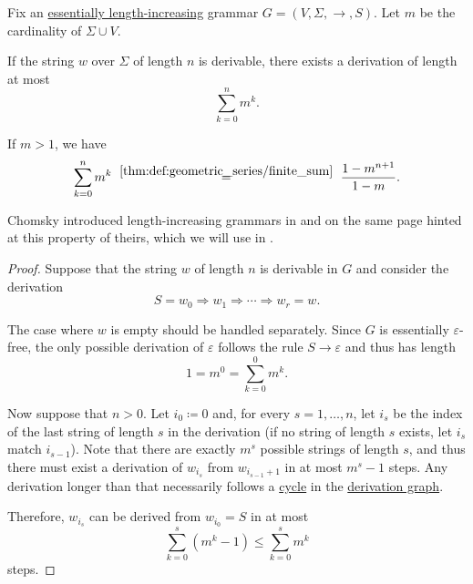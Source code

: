 \begin{lemma}\label{thm:length_increasing_grammar}
  Fix an \hyperref[def:length_increasing_grammar]{essentially length-increasing} grammar \( G = (V, \Sigma, \to, S) \). Let \( m \) be the cardinality of \( \Sigma \cup V \).

  If the string \( w \) over \( \Sigma \) of length \( n \) is derivable, there exists a derivation of length at most
  \begin{equation*}
    \sum_{k=0}^n m^k.
  \end{equation*}
\end{lemma}
\begin{comments}
  \item If \( m > 1 \), we have
  \begin{equation*}
    \sum_{k=0}^n m^k
    \reloset {\ref{thm:def:geometric_series/finite_sum}} =
    \frac {1 - m^{n+1}} {1 - m}.
  \end{equation*}

  \item Chomsky introduced length-increasing grammars in \cite[360]{Chomsky1963Grammars} and on the same page hinted at this property of theirs, which we will use in .
\end{comments}
\begin{proof}
  Suppose that the string \( w \) of length \( n \) is derivable in \( G \) and consider the derivation
  \begin{equation*}
    S = w_0 \Rightarrow w_1 \Rightarrow \cdots \Rightarrow w_r = w.
  \end{equation*}

  The case where \( w \) is empty should be handled separately. Since \( G \) is essentially \( \varepsilon \)-free, the only possible derivation of \( \varepsilon \) follows the rule \( S \to \varepsilon \) and thus has length
  \begin{equation*}
    1 = m^0 = \sum_{k=0}^0 m^k.
  \end{equation*}

  Now suppose that \( n > 0 \). Let \( i_0 \coloneqq 0 \) and, for every \( s = 1, \ldots, n \), let \( i_s \) be the index of the last string of length \( s \) in the derivation (if no string of length \( s \) exists, let \( i_s \) match \( i_{s-1} \)). Note that there are exactly \( m^s \) possible strings of length \( s \), and thus there must exist a derivation of \( w_{i_s} \) from \( w_{i_{s-1} + 1} \) in at most \( m^s - 1 \) steps. Any derivation longer than that necessarily follows a \hyperref[def:graph_cycle]{cycle} in the \hyperref[def:formal_grammar/graph]{derivation graph}.

  Therefore, \( w_{i_s} \) can be derived from \( w_{i_0} = S \) in at most
  \begin{equation*}
    \sum_{k=0}^s (m^k - 1) \leq \sum_{k=0}^s m^k
  \end{equation*}
  steps.
\end{proof}

